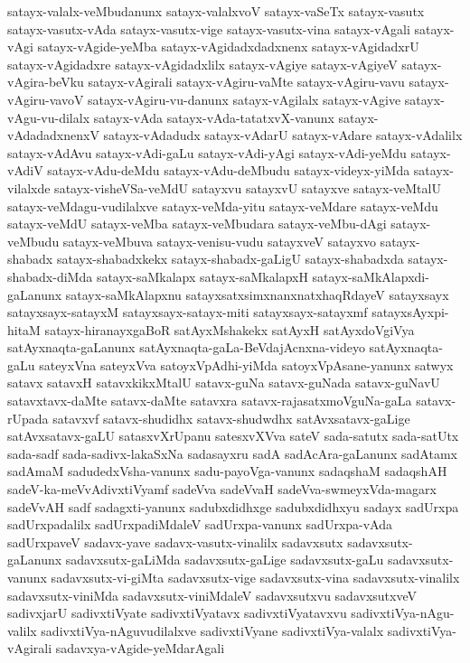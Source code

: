 {satayx-valalx-veMbudanunx
satayx-valalxvoV
satayx-vaSeTx
satayx-vasutx
satayx-vasutx-vAda
satayx-vasutx-vige
satayx-vasutx-vina
satayx-vAgali
satayx-vAgi
satayx-vAgide-yeMba
satayx-vAgidadxdadxnenx
satayx-vAgidadxrU
satayx-vAgidadxre
satayx-vAgidadxlilx
satayx-vAgiye
satayx-vAgiyeV
satayx-vAgira-beVku
satayx-vAgirali
satayx-vAgiru-vaMte
satayx-vAgiru-vavu
satayx-vAgiru-vavoV
satayx-vAgiru-vu-danunx
satayx-vAgilalx
satayx-vAgive
satayx-vAgu-vu-dilalx
satayx-vAda
satayx-vAda-tatatxvX-vanunx
satayx-vAdadadxnenxV
satayx-vAdadudx
satayx-vAdarU
satayx-vAdare
satayx-vAdalilx
satayx-vAdAvu
satayx-vAdi-gaLu
satayx-vAdi-yAgi
satayx-vAdi-yeMdu
satayx-vAdiV
satayx-vAdu-deMdu
satayx-vAdu-deMbudu
satayx-videyx-yiMda
satayx-vilalxde
satayx-visheVSa-veMdU
satayxvu
satayxvU
satayxve
satayx-veMtalU
satayx-veMdagu-vudilalxve
satayx-veMda-yitu
satayx-veMdare
satayx-veMdu
satayx-veMdU
satayx-veMba
satayx-veMbudara
satayx-veMbu-dAgi
satayx-veMbudu
satayx-veMbuva
satayx-venisu-vudu
satayxveV
satayxvo
satayx-shabadx
satayx-shabadxkekx
satayx-shabadx-gaLigU
satayx-shabadxda
satayx-shabadx-diMda
satayx-saMkalapx
satayx-saMkalapxH
satayx-saMkAlapxdi-gaLanunx
satayx-saMkAlapxnu
satayxsatxsimxnanxnatxhaqRdayeV
satayxsayx
satayxsayx-satayxM
satayxsayx-satayx-miti
satayxsayx-satayxmf
satayxsAyxpi-hitaM
satayx-hiranayxgaBoR
satAyxMshakekx
satAyxH
satAyxdoVgiVya
satAyxnaqta-gaLanunx
satAyxnaqta-gaLa-BeVdajAcnxna-videyo
satAyxnaqta-gaLu
sateyxVna
sateyxVva
satoyxVpAdhi-yiMda
satoyxVpAsane-yanunx
satwyx
satavx
satavxH
satavxkikxMtalU
satavx-guNa
satavx-guNada
satavx-guNavU
satavxtavx-daMte
satavx-daMte
satavxra
satavx-rajasatxmoVguNa-gaLa
satavx-rUpada
satavxvf
satavx-shudidhx
satavx-shudwdhx
satAvxsatavx-gaLige
satAvxsatavx-gaLU
satasxvXrUpanu
satesxvXVva
sateV
sada-satutx
sada-satUtx
sada-sadf
sada-sadivx-lakaSxNa
sadasayxru
sadA
sadAcAra-gaLanunx
sadAtamx
sadAmaM
sadudedxVsha-vanunx
sadu-payoVga-vanunx
sadaqshaM
sadaqshAH
sadeV-ka-meVvAdivxtiVyamf
sadeVva
sadeVvaH
sadeVva-swmeyxVda-magarx
sadeVvAH
sadf
sadagxti-yanunx
sadubxdidhxge
sadubxdidhxyu
sadayx
sadUrxpa
sadUrxpadalilx
sadUrxpadiMdaleV
sadUrxpa-vanunx
sadUrxpa-vAda
sadUrxpaveV
sadavx-yave
sadavx-vasutx-vinalilx
sadavxsutx
sadavxsutx-gaLanunx
sadavxsutx-gaLiMda
sadavxsutx-gaLige
sadavxsutx-gaLu
sadavxsutx-vanunx
sadavxsutx-vi-giMta
sadavxsutx-vige
sadavxsutx-vina
sadavxsutx-vinalilx
sadavxsutx-viniMda
sadavxsutx-viniMdaleV
sadavxsutxvu
sadavxsutxveV
sadivxjarU
sadivxtiVyate
sadivxtiVyatavx
sadivxtiVyatavxvu
sadivxtiVya-nAgu-valilx
sadivxtiVya-nAguvudilalxve
sadivxtiVyane
sadivxtiVya-valalx
sadivxtiVya-vAgirali
sadavxya-vAgide-yeMdarAgali
}
